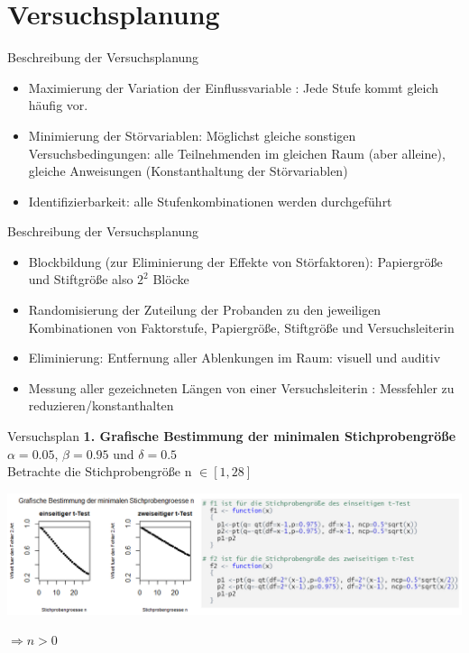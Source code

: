 \documentclass[ ngerman, fontsize= 10pt, headings=big, titlepage=true, xcolor=dvipsnames]{beamer}
\begin{document}
\section{Versuchsplanung}
\begin{frame}{Beschreibung der Versuchsplanung}
\begin{itemize}
\item Maximierung der Variation  der Einflussvariable : Jede Stufe kommt gleich häufig vor.\\
\item Minimierung der Störvariablen: Möglichst gleiche sonstigen Versuchsbedingungen: alle Teilnehmenden im gleichen Raum (aber alleine), gleiche Anweisungen	(Konstanthaltung der Störvariablen)
\item Identifizierbarkeit: alle Stufenkombinationen werden durchgeführt
\end{itemize}
\end{frame}
\begin{frame}{Beschreibung der Versuchsplanung}
\begin{itemize}
	\item Blockbildung (zur Eliminierung der Effekte von Störfaktoren): Papiergröße und Stiftgröße  also $2^2$ Blöcke 
	\item Randomisierung der Zuteilung der Probanden  zu den jeweiligen Kombinationen von  Faktorstufe, Papiergröße, Stiftgröße und Versuchsleiterin
	\item Eliminierung: Entfernung aller Ablenkungen im Raum: visuell und auditiv
	\item Messung aller gezeichneten Längen von einer Versuchsleiterin : Messfehler zu reduzieren/konstanthalten
		\end{itemize}
\end{frame}
\begin{frame}{Versuchsplan}
	\textbf{1. Grafische Bestimmung der minimalen Stichprobengröße}\\
	$\alpha =0.05$, $\beta = 0.95$ und $\delta =0.5$\\
	 Betrachte die Stichprobengröße n $\in [1,28]$
	 
	\begin{center}
		\includegraphics[scale=0.4]{Stichprobengröße.png}
	\end{center}

	$\Rightarrow n > 0$
\end{frame}
\end{document}
